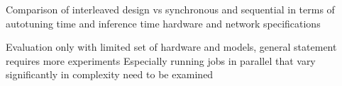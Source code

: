 Comparison of interleaved design vs synchronous and sequential in terms of autotuning time and inference time
hardware and network specifications

Evaluation only with limited set of hardware and models, general statement requires more experiments
Especially running jobs in parallel that vary significantly in complexity need to be examined